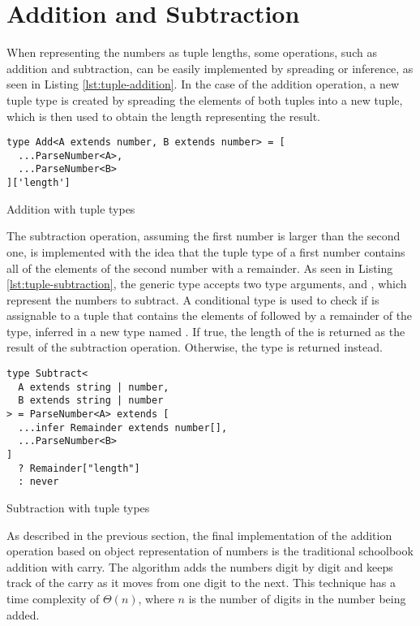 \section{Addition and Subtraction}

When representing the numbers as tuple lengths, some operations, such as addition and subtraction, can be easily implemented by spreading or inference, as seen in Listing \ref{lst:tuple-addition}. In the case of the addition operation, a new tuple type is created by spreading the elements of both tuples into a new tuple, which is then used to obtain the length representing the result.

\begin{listing}[ht]
  \begin{verbatim}
type Add<A extends number, B extends number> = [
  ...ParseNumber<A>, 
  ...ParseNumber<B>
]['length']
\end{verbatim}
  \caption{Addition with tuple types}\label{lst:tuple-addition}
\end{listing}

The subtraction operation, assuming the first number is larger than the second one, is implemented with the idea that the tuple type of a first number contains all of the elements of the second number with a remainder. As seen in Listing \ref{lst:tuple-subtraction}, the  generic type accepts two type arguments,  and , which represent the numbers to subtract. A conditional type is used to check if  is assignable to a tuple that contains the elements of  followed by a remainder of the  type, inferred in a new type named . If true, the length of the  is returned as the result of the subtraction operation. Otherwise, the  type is returned instead.

\begin{listing}[ht]
  \begin{verbatim}
type Subtract<
  A extends string | number,
  B extends string | number
> = ParseNumber<A> extends [
  ...infer Remainder extends number[],
  ...ParseNumber<B>
]
  ? Remainder["length"]
  : never
\end{verbatim}
  \caption{Subtraction with tuple types}\label{lst:tuple-subtraction}
\end{listing}

As described in the previous section, the final implementation of the addition operation based on object representation of numbers is the traditional schoolbook addition with carry. The algorithm adds the numbers digit by digit and keeps track of the carry as it moves from one digit to the next. This technique has a time complexity of $\Theta(n)$, where $n$ is the number of digits in the number being added.


